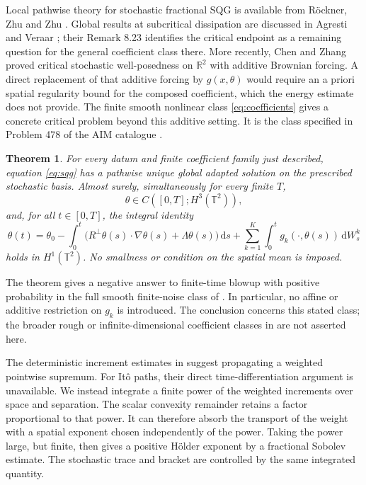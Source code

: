 \documentclass[11pt]{amsart}
\newtheorem{theorem}{Theorem}[section]
\theoremstyle{remark}
\numberwithin{equation}{section}
\newcommand{\T}{\mathbb T}
\newcommand{\R}{\mathbb R}
\newcommand{\dd}{\,\mathrm d}
\begin{document}
Local pathwise theory for stochastic fractional SQG is available from
R\"ockner, Zhu and Zhu \cite{RZZ}. Global results at subcritical dissipation
are discussed in Agresti and Veraar \cite[Theorem 8.22]{AV}; their
Remark 8.23 identifies the critical endpoint as a remaining question for the
general coefficient class there. More recently, Chen and Zhang
\cite[Section 6]{CZ} proved critical stochastic well-posedness on $\R^2$ with
additive Brownian forcing. A direct replacement of that additive forcing by
$g(x,\theta)$ would require an a priori spatial regularity bound for the
composed coefficient, which the energy estimate does not provide.
The finite smooth nonlinear class \eqref{eq:coefficients} gives a concrete
critical problem beyond this additive setting. It is the class specified in
Problem 478 of the AIM catalogue \cite{AIM478}.

\begin{theorem}\label{thm:main}
For every datum and finite coefficient family just described, equation
\eqref{eq:sqg} has a pathwise unique global adapted solution on the prescribed
stochastic basis. Almost surely, simultaneously for every finite $T$,
\[
 \theta\in C([0,T];H^3(\T^2)),
\]
and, for all $t\in[0,T]$, the integral identity
\[
 \theta(t)=\theta_0-
 \int_0^t\big(R^\perp\theta(s)\cdot\nabla\theta(s)+\Lambda\theta(s)\big)\dd s
 +\sum_{k=1}^K\int_0^t g_k(\cdot,\theta(s))\dd W^k_s
\]
holds in $H^1(\T^2)$. No smallness or condition on the spatial mean is imposed.
\end{theorem}

The theorem gives a negative answer to finite-time blowup with positive
probability in the full smooth finite-noise class of \cite{AIM478}.
In particular, no affine or additive restriction on $g_k$ is introduced.
The conclusion concerns this stated class; the broader rough or
infinite-dimensional coefficient classes in \cite{AV} are not asserted here.

The deterministic increment estimates in \cite{CTV} suggest propagating a
weighted pointwise supremum. For It\^o paths, their direct time-differentiation
argument is unavailable. We instead integrate a finite power of the weighted
increments over space and separation. The scalar convexity remainder retains
a factor proportional to that power. It can therefore absorb the transport of
the weight with a spatial exponent chosen independently of the power. Taking
the power large, but finite, then gives a positive H\"older exponent by a
fractional Sobolev estimate. The stochastic trace and bracket are controlled by
the same integrated quantity.
\end{document}
